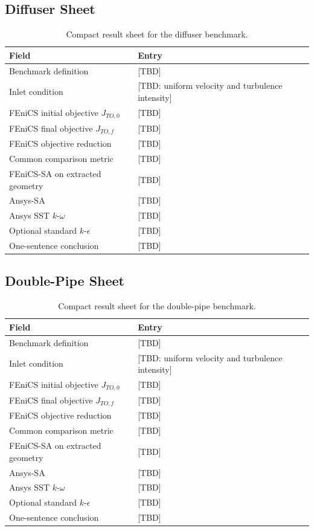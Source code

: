 \subsection{Diffuser Sheet}
\begin{table}[htbp]
	\centering
	\footnotesize
	\caption{Compact result sheet for the diffuser benchmark.}
	\label{tab:app_diffuser_sheet}
	\renewcommand{\arraystretch}{1.2}
	\begin{tabularx}{\textwidth}{l X}
		\hline
		\textbf{Field} & \textbf{Entry} \\
		\hline
		Benchmark definition & [TBD] \\
		Inlet condition & [TBD: uniform velocity and turbulence intensity] \\
		FEniCS initial objective $J_{TO,0}$ & [TBD] \\
		FEniCS final objective $J_{TO,f}$ & [TBD] \\
		FEniCS objective reduction & [TBD] \\
		Common comparison metric & [TBD] \\
		FEniCS-SA on extracted geometry & [TBD] \\
		Ansys-SA & [TBD] \\
		Ansys SST $k$-$\omega$ & [TBD] \\
		Optional standard $k$-$\epsilon$ & [TBD] \\
		One-sentence conclusion & [TBD] \\
		\hline
	\end{tabularx}
\end{table}

\subsection{Double-Pipe Sheet}
\begin{table}[htbp]
	\centering
	\footnotesize
	\caption{Compact result sheet for the double-pipe benchmark.}
	\label{tab:app_doublepipe_sheet}
	\renewcommand{\arraystretch}{1.2}
	\begin{tabularx}{\textwidth}{l X}
		\hline
		\textbf{Field} & \textbf{Entry} \\
		\hline
		Benchmark definition & [TBD] \\
		Inlet condition & [TBD: uniform velocity and turbulence intensity] \\
		FEniCS initial objective $J_{TO,0}$ & [TBD] \\
		FEniCS final objective $J_{TO,f}$ & [TBD] \\
		FEniCS objective reduction & [TBD] \\
		Common comparison metric & [TBD] \\
		FEniCS-SA on extracted geometry & [TBD] \\
		Ansys-SA & [TBD] \\
		Ansys SST $k$-$\omega$ & [TBD] \\
		Optional standard $k$-$\epsilon$ & [TBD] \\
		One-sentence conclusion & [TBD] \\
		\hline
	\end{tabularx}
\end{table}

